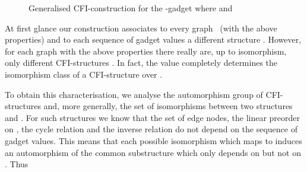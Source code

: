 \documentclass[a4paper,UKenglish]{lipics}
\theoremstyle{plain}
\begin{document}
\begin{figure}[ht]
\caption{Generalised CFI-construction for the -gadget where  and }
\label{fig:cfiq}
\end{figure}


\newcommand{\gadget}{}
At first glance our construction associates to every 
graph~ (with the above properties) and to each
sequence of gadget values   a different structure 
.
However, for each graph  with the above properties there really are, up 
to isomorphism, only  different CFI-structures .
In fact, the value  
completely determines the isomorphism class of a CFI-structure over .

\medskip
To obtain this characterisation, we  analyse the automorphism group 
of CFI-structures 
and, more generally, the set of isomorphisms 
between two structures  and 
.
For such structures we know that the set  of edge nodes, the linear 
preorder  on , the cycle relation  and the inverse relation 
 do not depend on the sequence of gadget values. 
This means that each possible isomorphism  which maps  to  
induces an automorphism of the common substructure
 which only 
depends on  but not on .
Thus  
\end{document}
